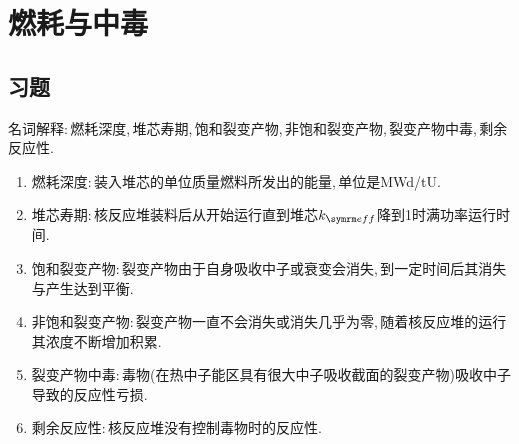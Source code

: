 \chapter{燃耗与中毒}
\section*{习题}

\begin{exercise}
    名词解释:\,燃耗深度,\,堆芯寿期,\,饱和裂变产物,\,非饱和裂变产物,\,裂变产物中毒,\,剩余反应性.\,
    \begin{solution}
        \begin{enumerate}[(1)]
            \item 燃耗深度:\,装入堆芯的单位质量燃料所发出的能量,\,单位是MWd/tU.\,
            \item 堆芯寿期:\,核反应堆装料后从开始运行直到堆芯$\keff$降到1时满功率运行时间.\,
            \item 饱和裂变产物:\,裂变产物由于自身吸收中子或衰变会消失,\,到一定时间后其消失与产生达到平衡.\,
            \item 非饱和裂变产物:\,裂变产物一直不会消失或消失几乎为零,\,随着核反应堆的运行其浓度不断增加积累.\,
            \item 裂变产物中毒:\,毒物(在热中子能区具有很大中子吸收截面的裂变产物)吸收中子导致的反应性亏损.\,
            \item 剩余反应性:\,核反应堆没有控制毒物时的反应性.\,
        \end{enumerate}
    \end{solution}
\end{exercise}

